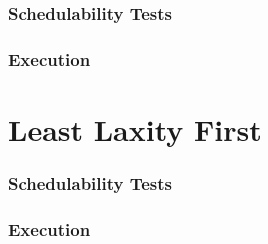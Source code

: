 \documentclass{beamer}
\begin{document}
\begin{frame}
\frametitle{Schedulability Tests}

\end{frame}

\begin{frame}
\frametitle{Execution}

\end{frame}

\section{Least Laxity First}

\begin{frame}
\frametitle{Schedulability Tests}

\end{frame}

\begin{frame}
\frametitle{Execution}

\end{frame}
\end{document}

